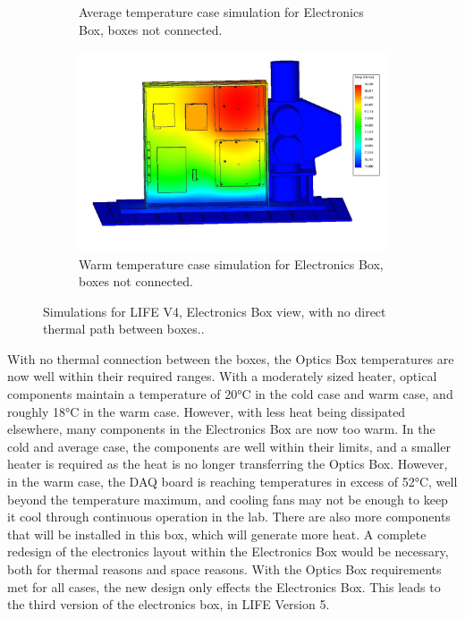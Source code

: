 \begin{figure}
\begin{subfigure}[h]{0.53\textwidth}
        \caption{Average temperature case simulation for Electronics Box, boxes not connected.}
        \label{fig:LIFE_V4_TA_Ebox_2b}
    \end{subfigure}
    \begin{subfigure}[h]{0.53\textwidth}
        \centering
        \includegraphics[width=\textwidth]{chap3_images/LIFE_V4_images/TA_Full_Model_Iter_12_ebox.JPG}
        \caption{Warm temperature case simulation for Electronics Box, boxes not connected.}
        \label{fig:LIFE_V4_TA_Ebox_2c}
    \end{subfigure}
    \caption{Simulations for LIFE V4, Electronics Box view, with no direct thermal path between boxes..}
    \label{LIFE_V4_TA_2_Ebox}
\end{figure}

With no thermal connection between the boxes, the Optics Box temperatures are now well within their required ranges. With a moderately sized heater, optical components maintain a temperature of 20°C in the cold case and warm case, and roughly 18°C in the warm case. However, with less heat being dissipated elsewhere, many components in the Electronics Box are now too warm. In the cold and average case, the components are well within their limits, and a smaller heater is required as the heat is no longer transferring the Optics Box. However, in the warm case, the DAQ board is reaching temperatures in excess of 52°C, well beyond the temperature maximum, and cooling fans may not be enough to keep it cool through continuous operation in the lab. There are also more components that will be installed in this box, which will generate more heat. A complete redesign of the electronics layout within the Electronics Box would be necessary, both for thermal reasons and space reasons. With the Optics Box requirements met for all cases, the new design only effects the Electronics Box. This leads to the third version of the electronics box, in LIFE Version 5.

